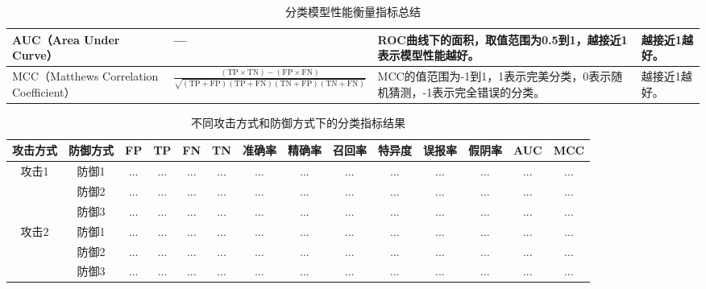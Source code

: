 \documentclass[lettersize,journal]{IEEEtran}
\begin{document}
\begin{table*}[h!]
\begin{tabularx}{\textwidth}{|l|X|X|X|}
AUC（Area Under Curve） & 
--- & 
ROC曲线下的面积，取值范围为0.5到1，越接近1表示模型性能越好。 & 越接近1越好。 \\ \hline

MCC（Matthews Correlation Coefficient） & 
$\frac{(\text{TP} \times \text{TN}) - (\text{FP} \times \text{FN})}{\sqrt{(\text{TP} + \text{FP})(\text{TP} + \text{FN})(\text{TN} + \text{FP})(\text{TN} + \text{FN})}}$ & 
MCC的值范围为-1到1，1表示完美分类，0表示随机猜测，-1表示完全错误的分类。 & 越接近1越好。 \\ \hline

\end{tabularx}
\caption{分类模型性能衡量指标总结}
\end{table*}


\begin{table*}[h!]
\small
\centering
\begin{tabular}{|c|c|c|c|c|c|c|c|c|c|c|c|c|c|}
\hline
\textbf{攻击方式} & \textbf{防御方式} & \textbf{FP} & \textbf{TP} & \textbf{FN} & \textbf{TN} & \textbf{准确率} & \textbf{精确率} & \textbf{召回率} & \textbf{特异度} & \textbf{误报率} & \textbf{假阴率} & \textbf{AUC} & \textbf{MCC} \\ \hline

\multirow{3}{*}{攻击1} & 防御1 & ... & ... & ... & ... & ... & ... & ... & ... & ... & ... & ... & ... \\ \cline{2-14}
                       & 防御2 & ... & ... & ... & ... & ... & ... & ... & ... & ... & ... & ... & ... \\ \cline{2-14}
                       & 防御3 & ... & ... & ... & ... & ... & ... & ... & ... & ... & ... & ... & ... \\ \hline

\multirow{3}{*}{攻击2} & 防御1 & ... & ... & ... & ... & ... & ... & ... & ... & ... & ... & ... & ... \\ \cline{2-14}
                       & 防御2 & ... & ... & ... & ... & ... & ... & ... & ... & ... & ... & ... & ... \\ \cline{2-14}
                       & 防御3 & ... & ... & ... & ... & ... & ... & ... & ... & ... & ... & ... & ... \\ \hline
\end{tabular}
\caption{不同攻击方式和防御方式下的分类指标结果}
\end{table*}
 
\end{document}
